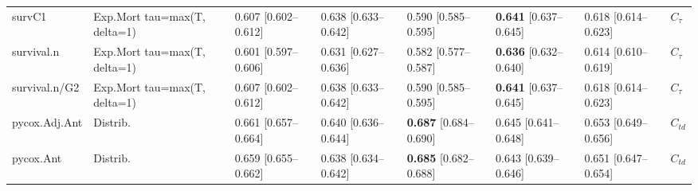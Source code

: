 \begin{tabular}{llllllll}
survC1 & Exp.Mort tau=max(T, delta=1) & 0.607 [0.602–0.612] & 0.638 [0.633–0.642] & 0.590 [0.585–0.595] & \textbf{0.641} [0.637–0.645] & 0.618 [0.614–0.623] & $C_{\tau}$\\
survival.n & Exp.Mort tau=max(T, delta=1) & 0.601 [0.597–0.606] & 0.631 [0.627–0.636] & 0.582 [0.577–0.587] & \textbf{0.636} [0.632–0.640] & 0.614 [0.610–0.619] & $C_{\tau}$\\
survival.n/G2 & Exp.Mort tau=max(T, delta=1) & 0.607 [0.602–0.612] & 0.638 [0.633–0.642] & 0.590 [0.585–0.595] & \textbf{0.641} [0.637–0.645] & 0.618 [0.614–0.623] & $C_{\tau}$\\
\addlinespace
pycox.Adj.Ant & Distrib. & 0.661 [0.657–0.664] & 0.640 [0.636–0.644] & \textbf{0.687} [0.684–0.690] & 0.645 [0.641–0.648] & 0.653 [0.649–0.656] & $C_{td}$\\
pycox.Ant & Distrib. & 0.659 [0.655–0.662] & 0.638 [0.634–0.642] & \textbf{0.685} [0.682–0.688] & 0.643 [0.639–0.646] & 0.651 [0.647–0.654] & $C_{td}$\\
\bottomrule
\end{tabular}
